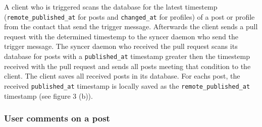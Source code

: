 \documentclass[12pt]{article}
\begin{document}
A client who is triggered scans the database for the latest timestemp (\texttt{remote\_published\_at} for posts and \texttt{changed\_at} for profiles) of a post or profile from the contact that send the
trigger message.
Afterwards the client sends a pull request with the determined timestemp to the syncer daemon who send the trigger message.
The syncer daemon who received the pull request scans its database for posts with a \texttt{published\_at} timestamp greater then the timestemp received with the pull request and sends all posts
meeting that condition to the client. The client saves all received posts in its database. For eachs post, the received \texttt{published\_at} timestamp is locally saved as the \texttt{remote\_published\_at}
timestamp (see figure 3 (b)).
\subsubsection{User comments on a post}
\end{document}
